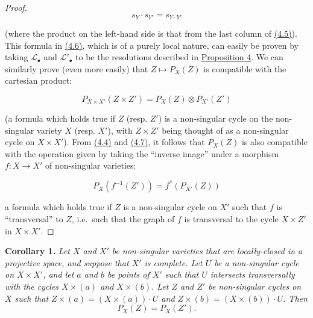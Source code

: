 \documentclass{article}
\newenvironment{itenv}[1]
  {\phantomsection\par\smallskip\noindent\textbf{#1.}\itshape}
  {\par\smallskip}
\newenvironment{eqenv}
  {}
  {}
\newcommand{\oldpage}[1]{\marginpar{\footnotesize$\Big\vert$ \textit{p.~#1}}}
\theoremstyle{definition}
\theoremstyle{definition}
\theoremstyle{definition}
\theoremstyle{definition}
\theoremstyle{remark}
\begin{document}
\begin{proof}
\leavevmode{}%
\begin{eqenv}
\[
  s_{Y}\cdot s_{Y'} = s_{Y\cdot Y'}
\tag{4.6}
\]

\end{eqenv}

(where the product on the left-hand side is that from the last column of \protect\hyperlink{fga-1-equation-4.5}{(4.5)}).
This formula in \protect\hyperlink{fga-1-equation-4.6}{(4.6)}, which is of a purely local nature, can easily be proven by taking \({\mathscr{L}}_\bullet\) and \({\mathscr{L}}'_\bullet\) to be the resolutions described in \protect\hyperlink{fga-1-proposition-4}{Proposition 4}.
We can similarly prove (even more easily) that \(Z\mapsto P_X(Z)\) is compatible with the cartesian product:

\leavevmode{}%
\begin{eqenv}
\[
  P_{X\times X'}(Z\times Z')  = P_X(Z)\otimes P_{X'}(Z')
\tag{4.7}
\]

\end{eqenv}

(a formula which holds true if \(Z\) (resp. \(Z'\)) is a non-singular cycle on the non-singular variety \(X\) (resp. \(X'\)), with \(Z\times Z'\) being thought of as a non-singular cycle on \(X\times X'\)).
From \protect\hyperlink{fga-1-equation-4.4}{(4.4)} and \protect\hyperlink{fga-1-equation-4.7}{(4.7)}, it follows that \(P_X(Z)\) is also compatible with the operation given by taking the ``inverse image'' under a morphism \(f\colon X\to X'\) of non-singular varieties:

\leavevmode{}%
\begin{eqenv}
\[
  P_X(f^{-1}(Z')) = f^*(P_{X'}(Z))
\tag{4.8}
\]

\end{eqenv}

a formula which holds true if \(Z\) is a non-singular cycle on \(X'\) such that \(f\) is ``transversal'' to \(Z\), i.e.~such that the graph of \(f\) is transversal to the cycle \(X\times Z'\) in \(X\times X'\).
\end{proof}

\leavevmode{}%
\begin{itenv}{Corollary 1}
\oldpage{149-13}Let \(X\) and \(X'\) be non-singular varieties that are locally-closed in a projective space, and suppose that \(X'\) is complete.
Let \(U\) be a non-singular cycle on \(X\times X'\), and let \(a\) and \(b\) be points of \(X'\) such that \(U\) intersects transversally with the cycles \(X\times(a)\) and \(X\times(b)\).
Let \(Z\) and \(Z'\) be non-singular cycles on \(X\) such that \(Z\times(a)=(X\times(a))\cdot U\) and \(Z\times(b)=(X\times(b))\cdot U\).
Then
\[
  P_X(Z) = P_X(Z').
\]

\end{itenv}
\end{document}
